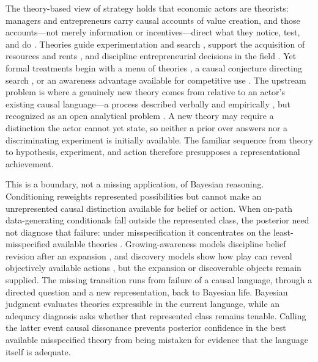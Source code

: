 \documentclass[11pt]{article}
\theoremstyle{definition}
\begin{document}
The theory-based view of strategy holds that economic actors are theorists: managers and entrepreneurs carry causal accounts of value creation, and those accounts---not merely information or incentives---direct what they notice, test, and do \citep{FelinZenger2017,FelinGambardellaZenger2024}.
Theories guide experimentation and search \citep{CamuffoEtAl2020,ChavdaGansStern2024}, support the acquisition of resources and rents \citep{EhrigZenger2024}, and discipline entrepreneurial decisions in the field \citep{CamuffoEtAl2024}.
Yet formal treatments begin with a menu of theories \citep{CamuffoEtAl2024}, a causal conjecture directing search \citep{ChavdaGansStern2024}, or an awareness advantage available for competitive use \citep{EhrigZenger2024}.
The upstream problem is where a genuinely new theory comes from relative to an actor's existing causal language---a process described verbally and empirically \citep{OttHannah2024}, but recognized as an open analytical problem \citep{FelinGambardellaZenger2024}.
A new theory may require a distinction the actor cannot yet state, so neither a prior over answers nor a discriminating experiment is initially available.
The familiar sequence from theory to hypothesis, experiment, and action therefore presupposes a representational achievement.

This is a boundary, not a missing application, of Bayesian reasoning.
Conditioning reweights represented possibilities but cannot make an unrepresented causal distinction available for belief or action.
When on-path data-generating conditionals fall outside the represented class, the posterior need not diagnose that failure: under misspecification it concentrates on the least-misspecified available theories \citep{Berk1966}.
Growing-awareness models discipline belief revision after an expansion \citep{KarniViero2013,KarniViero2017,Viero2021}, and discovery models show how play can reveal objectively available actions \citep{Schipper2021}, but the expansion or discoverable objects remain supplied.
The missing transition runs from failure of a causal language, through a directed question and a new representation, back to Bayesian life.
Bayesian judgment evaluates theories expressible in the current language, while an adequacy diagnosis asks whether that represented class remains tenable.
Calling the latter event causal dissonance prevents posterior confidence in the best available misspecified theory from being mistaken for evidence that the language itself is adequate.
\end{document}

